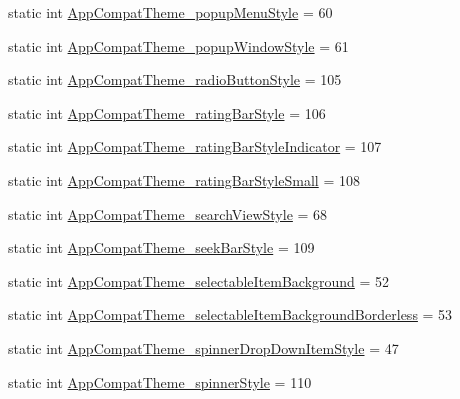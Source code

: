\begin{DoxyCompactItemize}
\item 
static int \hyperlink{classandroid_1_1support_1_1v7_1_1mediarouter_1_1R_1_1styleable_a56f5c9d8f50624e515a07a5936318b79}{App\+Compat\+Theme\+\_\+popup\+Menu\+Style} = 60
\item 
static int \hyperlink{classandroid_1_1support_1_1v7_1_1mediarouter_1_1R_1_1styleable_a1c2df8e2b925ae4820688441763caf8b}{App\+Compat\+Theme\+\_\+popup\+Window\+Style} = 61
\item 
static int \hyperlink{classandroid_1_1support_1_1v7_1_1mediarouter_1_1R_1_1styleable_a8dc461bdd424e8433282468c37c8d386}{App\+Compat\+Theme\+\_\+radio\+Button\+Style} = 105
\item 
static int \hyperlink{classandroid_1_1support_1_1v7_1_1mediarouter_1_1R_1_1styleable_ab10f79a17ff8b7943d3a05296cc7e765}{App\+Compat\+Theme\+\_\+rating\+Bar\+Style} = 106
\item 
static int \hyperlink{classandroid_1_1support_1_1v7_1_1mediarouter_1_1R_1_1styleable_adbfc1fbc4a808f8fe9c21f5cebc0979e}{App\+Compat\+Theme\+\_\+rating\+Bar\+Style\+Indicator} = 107
\item 
static int \hyperlink{classandroid_1_1support_1_1v7_1_1mediarouter_1_1R_1_1styleable_a851e1e8d644ea5c0306da068a33f70d1}{App\+Compat\+Theme\+\_\+rating\+Bar\+Style\+Small} = 108
\item 
static int \hyperlink{classandroid_1_1support_1_1v7_1_1mediarouter_1_1R_1_1styleable_ae78fcc03ef34fe74c5a9824c9cb8df51}{App\+Compat\+Theme\+\_\+search\+View\+Style} = 68
\item 
static int \hyperlink{classandroid_1_1support_1_1v7_1_1mediarouter_1_1R_1_1styleable_a94480fbd3dc2f8051c48e89dbc33eab6}{App\+Compat\+Theme\+\_\+seek\+Bar\+Style} = 109
\item 
static int \hyperlink{classandroid_1_1support_1_1v7_1_1mediarouter_1_1R_1_1styleable_ae6b277bbde29a995524dbf2f764ec5b8}{App\+Compat\+Theme\+\_\+selectable\+Item\+Background} = 52
\item 
static int \hyperlink{classandroid_1_1support_1_1v7_1_1mediarouter_1_1R_1_1styleable_a4b17798c04e6d1bb8e749b5feb1aae89}{App\+Compat\+Theme\+\_\+selectable\+Item\+Background\+Borderless} = 53
\item 
static int \hyperlink{classandroid_1_1support_1_1v7_1_1mediarouter_1_1R_1_1styleable_a7d8b19a24b9742bcfc7efca0b97d4088}{App\+Compat\+Theme\+\_\+spinner\+Drop\+Down\+Item\+Style} = 47
\item 
static int \hyperlink{classandroid_1_1support_1_1v7_1_1mediarouter_1_1R_1_1styleable_ad25bcd6aab6c43bde798b7d59a6ad960}{App\+Compat\+Theme\+\_\+spinner\+Style} = 110

\end{DoxyCompactItemize}

